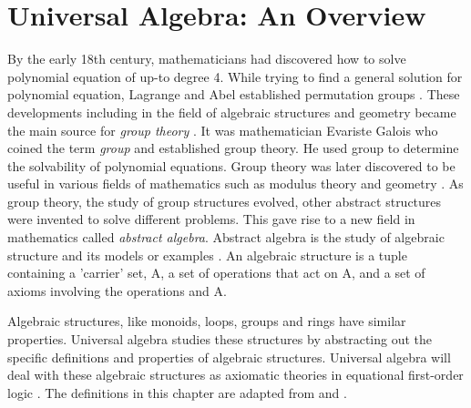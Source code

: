\chapter{Universal Algebra: An Overview}
By the early 18th century, mathematicians had discovered how to solve polynomial
equation of up-to degree 4. While trying to find a general solution for
polynomial equation, Lagrange and Abel established permutation groups
\cite{barnett2017roots}. These developments including in the field of algebraic
structures and geometry became the main source for \textit{group theory}
\cite{enwiki:1145792803}. It was mathematician Evariste Galois who coined the
term \emph{group} and established group theory. He used group to determine the
solvability of polynomial equations. Group theory was later discovered to be
useful in various fields of mathematics such as modulus theory and geometry
\cite{enwiki:1107380309}. As group theory, the study of group structures
evolved, other abstract structures were invented to solve different problems.
This gave rise to a new field in mathematics called \emph{abstract algebra}.
Abstract algebra is the study of algebraic structure and its models or examples
\cite{enwiki:1107380309}. An algebraic structure is a tuple containing a
'carrier' set, A, a set of operations that act on A, and a set of axioms
involving the operations and A. 

Algebraic structures, like monoids, loops, groups and rings have similar
properties. Universal algebra studies these structures by abstracting out the
specific definitions and properties of algebraic structures. Universal algebra
will deal with these algebraic structures as axiomatic theories in equational
first-order logic \cite{YSharoda}. The definitions in this chapter are adapted from
\cite{sankappanavar1981course} and \cite{abstractAlgebra}.

